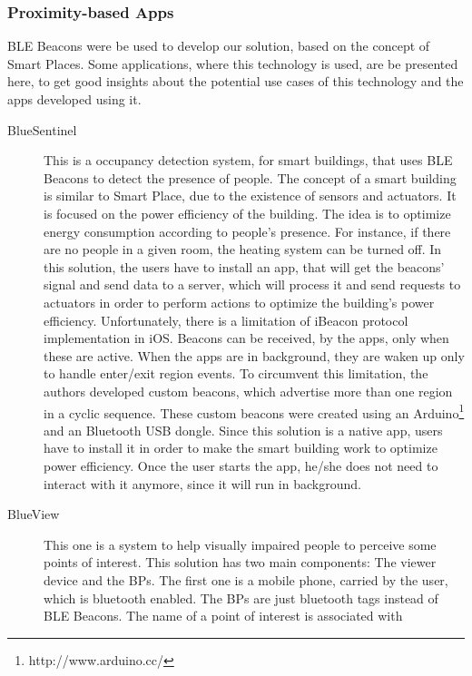\subsubsection{Proximity-based Apps}
\label{sub:background_ble_beacons_applications}
\gls{BLE} Beacons were
be used to develop our solution, based on the concept of Smart Places.
Some
applications, where this technology is used,
are be presented here, to
get good insights about the potential use cases of this
technology and the apps developed using it.
\begin{description}
  \item[BlueSentinel\cite{Conte2014}]
  This is a
  occupancy detection system, for smart buildings,
  that uses \gls{BLE} Beacons to detect the presence of
  people. The concept of a smart building
  is similar to Smart Place,
  due to the existence of sensors and actuators.
  It is focused on the power efficiency of the
  building. The idea is to optimize energy
  consumption according to people's presence.
  For instance, if there are no people in a given room,
  the heating system can be turned off.
  In this solution, the users have to install
  an app, that will get the beacons' signal and
  send data to a server, which will process it
  and send requests to actuators in order to
  perform actions to optimize the
  building's power efficiency.
  Unfortunately, there is a limitation
  of iBeacon protocol implementation
  in iOS.
  Beacons can be received, by the apps,
  only when these are active. When the apps are in
  background, they are waken up only to handle
  enter/exit region events. To circumvent this
  limitation, the authors developed custom
  beacons, which advertise more than one region
  in a cyclic sequence. These custom beacons
  were created using an
  Arduino\footnote{http://www.arduino.cc/}
  and an Bluetooth \gls{USB} dongle.
  Since this solution is a native app,
  users have to install it in order
  to make the smart building work to
  optimize power efficiency.
  Once the user starts the app, he/she does not
  need to interact with it anymore, since it
  will run in background.
  \item[BlueView\cite{Chen2013}]
  This one is a system to help
  visually impaired people to perceive some points of interest.
  This solution has two main components: The viewer device
  and the \glspl{BP}. The first one is a mobile phone,
  carried by the user, which is bluetooth enabled.
  The \glspl{BP} are just bluetooth tags instead of
  \gls{BLE} Beacons. The name of a point of interest is associated with

\end{description}

